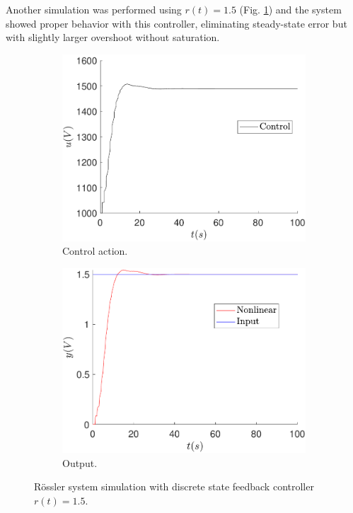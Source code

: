 	Another simulation was performed using $r(t)=1.5$ (Fig. \ref{fig:feedback_u_1_5}) and the system showed proper behavior with this controller, eliminating steady-state error but with slightly larger overshoot without saturation.
	\begin{figure}
        \centering
        \begin{subfigure}[b]{0.475\textwidth}
            \centering
            \includegraphics[scale=0.425]{files/feedback/Ref!0/control_sfc_u_1_5_ref_dif_0.pdf}
            \caption{Control action.}
        \end{subfigure}
        \vskip0.1cm
        \begin{subfigure}[b]{0.475\textwidth}   
            \centering 
            \includegraphics[scale=0.425]{files/feedback/Ref!0/sfc_u_1_5_ref_dif_0.pdf}
            \caption{Output.}
        \end{subfigure}
        \caption{Rössler system simulation with discrete state feedback controller $r(t)=1.5$.}
        \label{fig:feedback_u_1_5}
	\end{figure}
	

